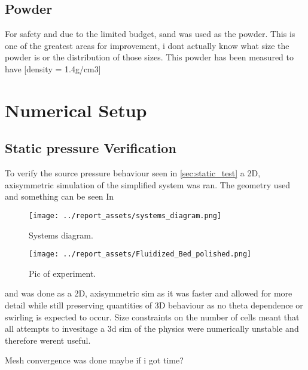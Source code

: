 \subsection{Powder}
For safety and due to the limited budget, sand was used as the powder. This is one of the greatest areas for improvement, i dont actually know what size the powder is or the distribution of those sizes. This powder has been measured to have [density = 1.4g/cm3]

\newpage
\section{Numerical Setup}
\subsection{Static pressure Verification}
To verify the source pressure behaviour seen in \autoref{sec:static_test} a 2D, axisymmetric simulation of the simplified system was ran. The geometry used and something can be seen In
\begin{figure}[htbp]
    \centering

    \begin{minipage}{0.95\textwidth}
        \centering
        \texttt{[image: ../report\_assets/systems\_diagram.png]}
        \caption{Systems diagram.}\label{fig:geometry_static_sim}
    \end{minipage}
    \hfill
    \begin{minipage}{0.45\textwidth}
        \centering
        \texttt{[image: ../report\_assets/Fluidized\_Bed\_polished.png]}
        \caption{Pic of experiment.}\label{fig:something_else}
    \end{minipage}

\end{figure}
and was done as a 2D, axisymmetric sim as it was faster and allowed for more detail while still preserving quantities of 3D behaviour as no theta dependence or swirling is expected to occur. Size constraints on the number of cells meant that all attempts to invesitage a 3d sim of the physics were numerically unstable and therefore werent useful.

Mesh convergence was done maybe if i got time?

